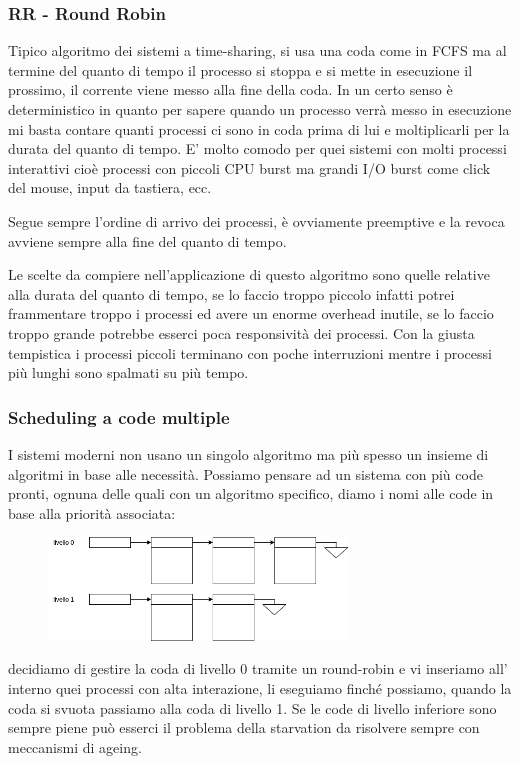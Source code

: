 \subsubsection{RR - Round Robin}    
Tipico algoritmo dei sistemi a time-sharing, si usa una coda come in FCFS ma al termine del quanto di tempo il processo si stoppa e si mette in esecuzione il prossimo, il corrente viene messo alla fine della coda.
In un certo senso è deterministico in quanto per sapere quando un processo verrà messo in esecuzione mi basta contare quanti processi ci sono in coda prima di lui e moltiplicarli per la durata del quanto di tempo.
E' molto comodo per quei sistemi con molti processi interattivi cioè processi con piccoli CPU burst ma grandi I/O burst come click del mouse, input da tastiera, ecc.

Segue sempre l'ordine di arrivo dei processi, è ovviamente preemptive e la revoca avviene sempre alla fine del quanto di tempo.

Le scelte da compiere nell'applicazione di questo algoritmo sono quelle relative alla durata del quanto di tempo, se lo faccio troppo piccolo infatti potrei frammentare troppo i processi ed avere un enorme overhead inutile, se lo faccio troppo grande potrebbe esserci poca responsività dei processi.
Con la giusta tempistica i processi piccoli terminano con poche interruzioni mentre i processi più lunghi sono spalmati su più tempo.

\subsubsection{Scheduling a code multiple}
I sistemi moderni non usano un singolo algoritmo ma più spesso un insieme di algoritmi in base alle necessità.
Possiamo pensare ad un sistema con più code pronti, ognuna delle quali con un algoritmo specifico, diamo i nomi alle code in base alla priorità associata:
\begin{figure}[H]
    \centering
    \includegraphics[width=300px]{images/4_Scheduling/code_multiple.png}
\end{figure}
decidiamo di gestire la coda di livello 0 tramite un round-robin e vi inseriamo all' interno quei processi con alta interazione, li eseguiamo finché possiamo, quando la coda si svuota passiamo alla coda di livello 1.
Se le code di livello inferiore sono sempre piene può esserci il problema della starvation da risolvere sempre con meccanismi di ageing.

